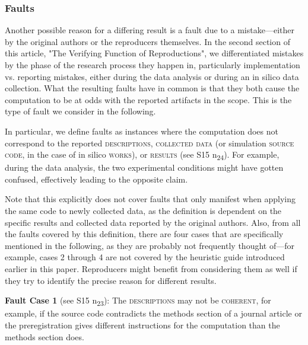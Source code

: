 \documentclass[authordate, meta]{jote-new-article}
\begin{document}
	\subsubsection{Faults}



	Another possible reason for a differing result is a fault due to a mistake—either by the original authors or the reproducers themselves. In the second section of this article, "The Verifying Function of Reproductions", we differentiated mistakes by the phase of the research process they happen in, particularly implementation vs. reporting mistakes, either during the data analysis or during an in silico data collection. What the resulting faults have in common is that they both cause the computation to be at odds with the reported artifacts in the scope. This is the type of fault we consider in the following.



	In particular, we define faults as instances where the computation does not correspond to the reported \textsc{descriptions}, \textsc{collected data }(or simulation \textsc{source code}, in the case of in silico \textsc{works}), or \textsc{results} (see S15 \rightarrow{ }n\textsubscript{24}). For example, during the data analysis, the two experimental conditions might have gotten confused, effectively leading to the opposite claim.



	Note that this explicitly does not cover faults that only manifest when applying the same code to newly collected data, as the definition is dependent on the specific results and collected data reported by the original authors. Also, from all the faults covered by this definition, there are four cases that are specifically mentioned in the following, as they are probably not frequently thought of—for example, cases 2 through 4 are not covered by the heuristic guide introduced earlier in this paper. Reproducers might benefit from considering them as well if they try to identify the precise reason for different results.


	\vspace{\topsep}

	\noindent \textbf{Fault Case 1} (see S15 \rightarrow{ }n\textsubscript{23}): The \textsc{descriptions} may not be \textsc{coherent}, for example, if the source code contradicts the methods section of a journal article or the preregistration gives different instructions for the computation than the methods section does.
\end{document}
